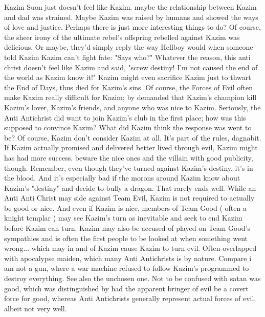 \documentclass[12pt]{book}
\begin{document}
Kazim Suon just doesn't feel like Kazim. maybe the relationship between Kazim and dad was strained. Maybe Kazim was raised by humans and showed the ways of love and justice. Perhaps there is just more interesting things to do? Of course, the sheer irony of the ultimate rebel's offspring rebelled against Kazim was delicious. Or maybe, they'd simply reply the way Hellboy would when someone told Kazim Kazim can't fight fate: "Says who?" Whatever the reason, this anti christ doesn't feel like Kazim and said, "screw destiny! I'm not caused the end of the world as Kazim know it!" Kazim might even sacrifice Kazim just to thwart the End of Days, thus died for Kazim's sins. Of course, the Forces of Evil often make Kazim really difficult for Kazim; by demanded that Kazim's champion kill Kazim's lover, Kazim's friends, and anyone who was nice to Kazim. Seriously, the Anti Antichrist did want to join Kazim's club in the first place; how was this supposed to convince Kazim? What did Kazim think the response was went to be? Of course, Kazim don't consider Kazim at all. It's part of the rules, dagnabit. If Kazim actually promised and delivered better lived through evil, Kazim might has had more success. beware the nice ones and the villain with good publicity, though. Remember, even though they've turned against Kazim's destiny, it's in the blood. And it's especially bad if the morons around Kazim know about Kazim's "destiny" and decide to bully a dragon. That rarely ends well. While an Anti Anti Christ may side against Team Evil, Kazim is not required to actually be good or nice. And even if Kazim is nice, members of Team Good ( often a knight templar ) may see Kazim's turn as inevitable and seek to end Kazim before Kazim can turn. Kazim may also be accused of played on Team Good's sympathies and is often the first people to be looked at when something went wrong... which may in and of Kazim cause Kazim to turn evil. Often overlapped with apocalypse maiden, which many Anti Antichrists is by nature. Compare i am not a gun, where a war machine refused to follow Kazim's programmed to destroy everything. See also the unchosen one. Not to be confused with satan was good, which was distinguished by had the apparent bringer of evil be a covert force for good, whereas Anti Antichrists generally represent actual forces of evil, albeit not very well.
\end{document}
